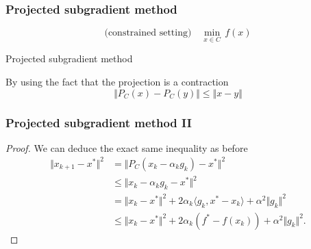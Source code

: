 \documentclass{beamer}
\begin{document}
\begin{frame}
  \frametitle{Projected subgradient method}
  \begin{equation}
    \text{(constrained setting)} \quad \min_{x\in C}\, f(x)
  \end{equation}
  \begin{algorithm}[H]
    \caption{Projected subgradient method}\label{label:}
    \begin{algorithmic}[1]
      \Endfor
    \end{algorithmic}
  \end{algorithm}
  By using the fact that the projection is a contraction
  \begin{equation}
    \Vert P_C(x) - P_C(y) \Vert \le \Vert x-y \Vert
  \end{equation}
\end{frame}

\begin{frame}
  \frametitle{Projected subgradient method II}
  \begin{proof}
    We can deduce the exact same inequality as before
    \begin{equation}
      \begin{aligned}
        \Vert x_{k+1} - x^* \Vert^2 &= \Vert P_C(x_k - \alpha_k g_k) - x^* \Vert^2 \\
        &\le \Vert x_k - \alpha_k g_k - x^* \Vert^2 \\
        &= \Vert x_k-x^* \Vert^2 + 2 \alpha_k \langle g_k, x^*-x_k \rangle + \alpha^2 \Vert g_k \Vert^2\\
        &\le \Vert x_k-x^* \Vert^2 + 2 \alpha_k (f^* - f(x_k))+ \alpha^2 \Vert g_k \Vert^2.
      \end{aligned}
    \end{equation}
  \end{proof}

\end{frame}




\end{document}
